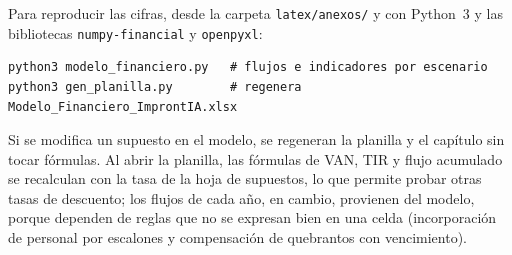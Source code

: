 Para reproducir las cifras, desde la carpeta \texttt{latex/anexos/} y con Python~3 y las bibliotecas \texttt{numpy-financial} y \texttt{openpyxl}:

\begin{verbatim}
python3 modelo_financiero.py   # flujos e indicadores por escenario
python3 gen_planilla.py        # regenera Modelo_Financiero_ImprontIA.xlsx
\end{verbatim}

Si se modifica un supuesto en el modelo, se regeneran la planilla y el capítulo sin tocar fórmulas. Al abrir la planilla, las fórmulas de VAN, TIR y flujo acumulado se recalculan con la tasa de la hoja de supuestos, lo que permite probar otras tasas de descuento; los flujos de cada año, en cambio, provienen del modelo, porque dependen de reglas que no se expresan bien en una celda (incorporación de personal por escalones y compensación de quebrantos con vencimiento).
